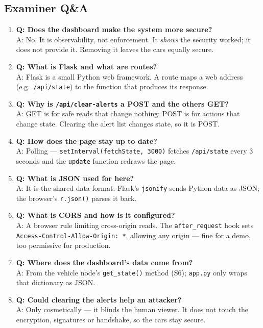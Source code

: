 \documentclass[11pt,a4paper]{report}
\begin{document}
\subsection{Examiner Q\&A}
\begin{enumerate}
  \item \textbf{Q: Does the dashboard make the system more secure?}\\
        A: No. It is observability, not enforcement. It \emph{shows} the security
        worked; it does not provide it. Removing it leaves the cars equally
        secure.
  \item \textbf{Q: What is Flask and what are routes?}\\
        A: Flask is a small Python web framework. A route maps a web address
        (e.g.\ \texttt{/api/state}) to the function that produces its response.
  \item \textbf{Q: Why is \texttt{/api/clear-alerts} a POST and the others GET?}\\
        A: GET is for safe reads that change nothing; POST is for actions that
        change state. Clearing the alert list changes state, so it is POST.
  \item \textbf{Q: How does the page stay up to date?}\\
        A: Polling --- \texttt{setInterval(fetchState, 3000)} fetches
        \texttt{/api/state} every 3 seconds and the \texttt{update} function
        redraws the page.
  \item \textbf{Q: What is JSON used for here?}\\
        A: It is the shared data format. Flask's \texttt{jsonify} sends Python
        data as JSON; the browser's \texttt{r.json()} parses it back.
  \item \textbf{Q: What is CORS and how is it configured?}\\
        A: A browser rule limiting cross-origin reads. The \texttt{after\_request}
        hook sets \texttt{Access-Control-Allow-Origin: *}, allowing any origin
        --- fine for a demo, too permissive for production.
  \item \textbf{Q: Where does the dashboard's data come from?}\\
        A: From the vehicle node's \texttt{get\_state()} method (S6);
        \texttt{app.py} only wraps that dictionary as JSON.
  \item \textbf{Q: Could clearing the alerts help an attacker?}\\
        A: Only cosmetically --- it blinds the human viewer. It does not touch
        the encryption, signatures or handshake, so the cars stay secure.
\end{enumerate}
\end{document}
